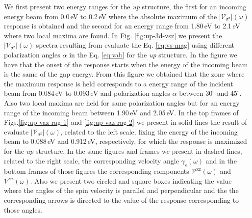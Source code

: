 \documentclass[prb,11pt,tightenlines,twocolumn,aps]{revtex4-1}
\begin{document}
We first present two energy ranges for the \emph{up} structure, the first for an
incoming energy beam from 0.0\,eV to 0.2\,eV where the absolute maximum of the
$|\mathcal{V}_{\sigma^{\mathrm{z}}}|(\omega)$ response is obtained and the
second for an energy range from 1.80\,eV to 2.1\,eV where two local maxima are
found.
% 
In Fig. \ref{fig:up-3d-vsz} we present the
$|\mathcal{V}_{\sigma^{\mathrm{z}}}|(\omega)$ spectra resulting from evaluate
the Eq. \eqref{eq:vs-mag} using different polarization angles $\alpha$ in the
Eq. \eqref{eq:vab} for the \emph{up} structure. In the figure we have that the
onset of the response starts when the energy of the incoming beam is the same of
the gap energy.
% 
From this figure we obtained that the zone where the maximum response is held
corresponds to a energy range of the incident beam from 0.084\,eV to 0.093\,eV
and polarization angles $\alpha$ between $30^{\circ}$ and $45^{\circ}$. Also two
local maxima are held for same polarization angles but for an energy range of
the incoming beam between 1.90\,eV and 2.05\,eV.
% 
In the top frames of Figs.\ref{fig:up-vaz-rag-1} and \ref{fig:up-vaz-rag-2} we
present in solid lines the result of evaluate
$|\mathcal{V}_{\sigma^{\mathrm{z}}}|(\omega)$, related to the left scale, fixing
the energy of the incoming beam to 0.088\,eV and 0.912\,eV, respectively, for
which the response is maximized for the \emph{up} structure. In the same figures
and frames we present in dashed lines, related to the right scale, the
corresponding velocity angle $\gamma_{\mathrm{z}}(\omega)$ and in the bottom
frames of those figures the corresponding components
$\mathcal{V}^{\mathrm{xz}}(\omega)$ and $\mathcal{V}^{\mathrm{yz}}(\omega)$.
Also we present two circled and square boxes indicating the value where the
angles of the spin velocity is parallel and perpendicular and the the
corresponding arrows is directed to the value of the response corresponding to
those angles.

\end{document}
